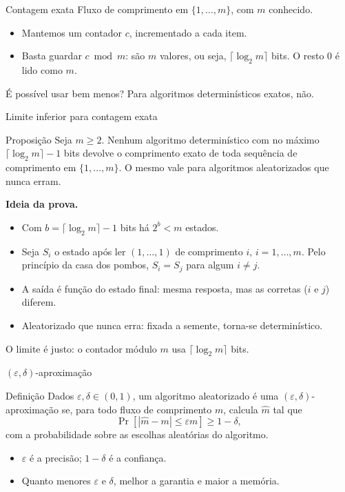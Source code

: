 \documentclass[aspectratio=169,10pt]{beamer}
\newcommand{\conj}[1]{\{#1\}}
\newcommand{\teto}[1]{\lceil #1\rceil}
\newcommand{\Abs}[1]{\left|#1\right|}
\newcommand{\ProbE}[1]{\Pr\!\left[#1\right]}
\begin{document}
\begin{frame}{Contagem exata}
  Fluxo de comprimento em $\conj{1,\dots,m}$, com $m$ conhecido.
  \begin{itemize}
  \item Mantemos um contador $c$, incrementado a cada item.
  \item Basta guardar $c \bmod m$: são $m$ valores, ou seja,
    $\teto{\log_2 m}$ bits. O resto $0$ é lido como $m$.
  \end{itemize}
  \medskip
  \alert{É possível usar bem menos?} Para algoritmos determinísticos
  exatos, não.
\end{frame}

\begin{frame}{Limite inferior para contagem exata}
  \begin{block}{Proposição}
    Seja $m\geq2$. Nenhum algoritmo determinístico com no máximo
    $\teto{\log_2m}-1$ bits devolve o comprimento exato de toda
    sequência de comprimento em $\conj{1,\dots,m}$. O mesmo vale para
    algoritmos aleatorizados que nunca erram.
  \end{block}
  \textbf{Ideia da prova.}
  \begin{itemize}
  \item Com $b=\teto{\log_2m}-1$ bits há $2^b<m$ estados.
  \item Seja $S_i$ o estado após ler $(1,\dots,1)$ de comprimento $i$,
    $i=1,\dots,m$. Pelo princípio da casa dos pombos, $S_i=S_j$ para
    algum $i\neq j$.
  \item A saída é função do estado final: mesma resposta, mas as
    corretas ($i$ e $j$) diferem.
  \item Aleatorizado que nunca erra: fixada a semente, torna-se
    determinístico.
  \end{itemize}
  O limite é justo: o contador módulo $m$ usa $\teto{\log_2m}$ bits.
\end{frame}

\begin{frame}{$(\varepsilon,\delta)$-aproximação}
  \begin{block}{Definição}
    Dados $\varepsilon,\delta\in(0,1)$, um algoritmo aleatorizado é uma
    \alert{$(\varepsilon,\delta)$-aproximação} se, para todo fluxo de
    comprimento $m$, calcula $\widehat m$ tal que
    \[
      \ProbE{\Abs{\widehat m-m}\leq\varepsilon m}\geq1-\delta,
    \]
    com a probabilidade sobre as escolhas aleatórias do algoritmo.
  \end{block}
  \begin{itemize}
  \item $\varepsilon$ é a \alert{precisão}; $1-\delta$ é a
    \alert{confiança}.
  \item Quanto menores $\varepsilon$ e $\delta$, melhor a garantia e
    maior a memória.
  \end{itemize}
\end{frame}
\end{document}
